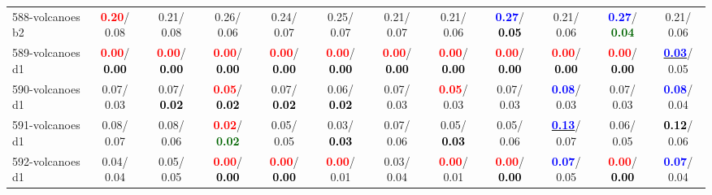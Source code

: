 \begin{table}[h]
\begin{center}
{\begin{tabular}{lc|c|c|c|c|c|c|c|c|c|c}
588-volcanoes b2 & \textcolor{red}{\textbf{  0.20}}/  0.08 &   0.21/  0.08 &   0.26/  0.06 &   0.24/  0.07 &   0.25/  0.07 &   0.21/  0.07 &   0.21/  0.06 & \textcolor{blue}{\textbf{  0.27}}/\textcolor{black}{\textbf{  0.05}} &   0.21/  0.06 & \textcolor{blue}{\textbf{  0.27}}/\textcolor{darkgreen}{\textbf{  0.04}} &   0.21/  0.06 \\
589-volcanoes d1 & \textcolor{red}{\textbf{  0.00}}/\textcolor{black}{\textbf{  0.00}} & \textcolor{red}{\textbf{  0.00}}/\textcolor{black}{\textbf{  0.00}} & \textcolor{red}{\textbf{  0.00}}/\textcolor{black}{\textbf{  0.00}} & \textcolor{red}{\textbf{  0.00}}/\textcolor{black}{\textbf{  0.00}} & \textcolor{red}{\textbf{  0.00}}/\textcolor{black}{\textbf{  0.00}} & \textcolor{red}{\textbf{  0.00}}/\textcolor{black}{\textbf{  0.00}} & \textcolor{red}{\textbf{  0.00}}/\textcolor{black}{\textbf{  0.00}} & \textcolor{red}{\textbf{  0.00}}/\textcolor{black}{\textbf{  0.00}} & \textcolor{red}{\textbf{  0.00}}/\textcolor{black}{\textbf{  0.00}} & \textcolor{red}{\textbf{  0.00}}/\textcolor{black}{\textbf{  0.00}} & \underline{\textcolor{blue}{\textbf{  0.03}}}/  0.05 \\
590-volcanoes d1 &   0.07/  0.03 &   0.07/\textcolor{black}{\textbf{  0.02}} & \textcolor{red}{\textbf{  0.05}}/\textcolor{black}{\textbf{  0.02}} &   0.07/\textcolor{black}{\textbf{  0.02}} &   0.06/\textcolor{black}{\textbf{  0.02}} &   0.07/  0.03 & \textcolor{red}{\textbf{  0.05}}/  0.03 &   0.07/  0.03 & \textcolor{blue}{\textbf{  0.08}}/  0.03 &   0.07/  0.03 & \textcolor{blue}{\textbf{  0.08}}/  0.04 \\ \hline
591-volcanoes d1 &   0.08/  0.07 &   0.08/  0.06 & \textcolor{red}{\textbf{  0.02}}/\textcolor{darkgreen}{\textbf{  0.02}} &   0.05/  0.05 &   0.03/\textcolor{black}{\textbf{  0.03}} &   0.07/  0.06 &   0.05/\textcolor{black}{\textbf{  0.03}} &   0.05/  0.06 & \underline{\textcolor{blue}{\textbf{  0.13}}}/  0.07 &   0.06/  0.05 & \textcolor{black}{\textbf{  0.12}}/  0.06 \\
592-volcanoes d1 &   0.04/  0.04 &   0.05/  0.05 & \textcolor{red}{\textbf{  0.00}}/\textcolor{black}{\textbf{  0.00}} & \textcolor{red}{\textbf{  0.00}}/\textcolor{black}{\textbf{  0.00}} & \textcolor{red}{\textbf{  0.00}}/  0.01 &   0.03/  0.04 & \textcolor{red}{\textbf{  0.00}}/  0.01 & \textcolor{red}{\textbf{  0.00}}/\textcolor{black}{\textbf{  0.00}} & \textcolor{blue}{\textbf{  0.07}}/  0.05 & \textcolor{red}{\textbf{  0.00}}/\textcolor{black}{\textbf{  0.00}} & \textcolor{blue}{\textbf{  0.07}}/  0.04 \\

\end{tabular}}
\end{center}
\end{table}
